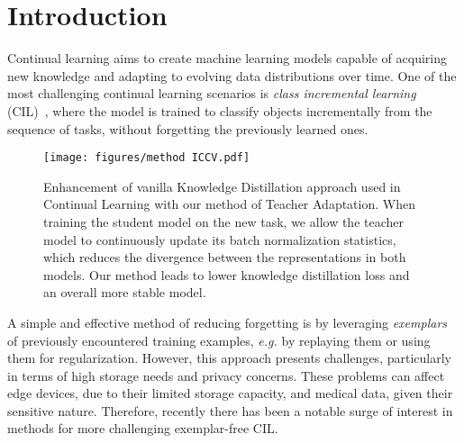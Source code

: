 \documentclass[10pt,twocolumn,letterpaper]{article}
\newcommand\bt[1]{{\color{blue} {\bf BT:} #1}}
\newcommand\rev[1]{{#1}}
\begin{document}
\section{Introduction}
\label{sec:intro}

Continual learning aims to create machine learning models capable of acquiring new knowledge and adapting to evolving data distributions over time.
One of the most challenging continual learning scenarios is \emph{class incremental learning} (CIL)~\cite{van2019three,masana2022class}, where the model is trained to classify objects incrementally from the sequence of tasks, without forgetting the previously learned ones. 

\begin{figure}[t]
    \centering
    \texttt{[image: figures/method ICCV.pdf]}

   \caption{
   \rev{
   Enhancement of vanilla Knowledge Distillation approach used in Continual Learning with our method of Teacher Adaptation. When training the student model on the new task, we allow the teacher model to continuously update its batch normalization statistics, which reduces the divergence between the representations in both models. Our method leads to lower knowledge distillation loss and an overall more stable model.}}
   \label{fig:method}
\end{figure}


A simple and effective method of reducing forgetting is by leveraging \emph{exemplars}~\cite{rebuffi2017icarl,iscen2022memory,bang2021rainbow,prabhu2020gdumb} of previously encountered training examples, {\it e.g.} by replaying them or using them for regularization.
However, this approach presents challenges, particularly in terms of high storage needs and privacy concerns. These problems can affect edge devices, due to their limited storage capacity, and medical data, given their sensitive nature. 
Therefore, recently there has been a notable surge of interest in methods for more challenging exemplar-free CIL.
\end{document}
